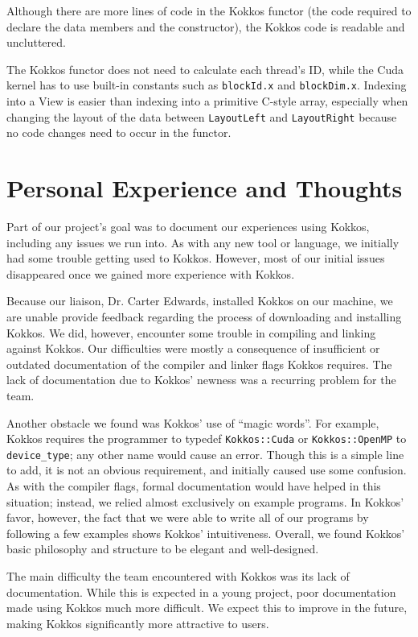 Although there are more lines of code in the Kokkos functor (the code required to
declare the data members and the constructor), the Kokkos code is readable and
uncluttered.

The Kokkos functor does not need to calculate each thread's ID, while the Cuda
kernel has to use built-in constants such as \texttt{blockId.x} and \texttt{blockDim.x}.
Indexing into a View is easier than indexing into a primitive C-style array,
especially when changing the layout of the data between \texttt{LayoutLeft} and
\texttt{LayoutRight} because no code changes need to occur in the functor.

\section{Personal Experience and Thoughts}
\label{sec:Thoughts}

Part of our project's goal was to document our experiences using Kokkos,
including any issues we run into.  As with any new tool or language, we
initially had some trouble getting used to Kokkos.  However, most of our initial
issues disappeared once we gained more experience with Kokkos.

Because our liaison, Dr. Carter Edwards, installed Kokkos on our machine, we are
unable provide feedback regarding the process of downloading and installing
Kokkos.  We did, however, encounter some trouble in compiling and linking
against Kokkos. Our difficulties were mostly a consequence of insufficient or
outdated documentation of the compiler and linker flags Kokkos requires.  The
lack of documentation due to Kokkos' newness was a recurring problem for the
team.

Another obstacle we found was Kokkos' use of ``magic words''.  For example,
Kokkos requires the programmer to typedef \texttt{Kokkos::Cuda} or \texttt{Kokkos::OpenMP} to
\texttt{device\_type}; any other name would cause an error.  Though this is a simple line
to add, it is not an obvious requirement, and initially caused use some
confusion.  As with the compiler flags, formal documentation would have helped
in this situation; instead, we relied almost exclusively on example programs.
In Kokkos' favor, however, the fact that we were able to write all of our programs by
following a few examples shows Kokkos' intuitiveness.  Overall, we found Kokkos'
basic philosophy and structure to be elegant and well-designed.

The main difficulty the team encountered with Kokkos was its lack of
documentation.  While this is expected in a young project, poor documentation
made using Kokkos much more difficult.  We expect this to improve in the future,
making Kokkos significantly more attractive to users.

